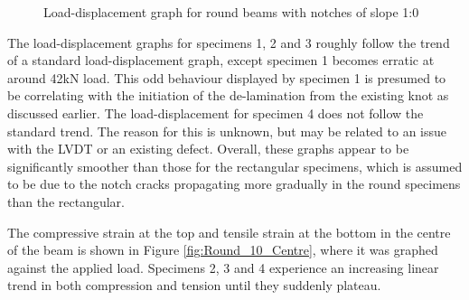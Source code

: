 \documentclass[11pt,a4paper]{article}
\numberwithin{equation}{subsection}
\begin{document}
\vspace*{\baselineskip}

\begin{figure}[h]
	\begin{center}
	\end{center}
	\caption{Load-displacement graph for round beams with notches of slope 1:0}
	\label{fig:Round_10_def}
\end{figure}

\noindent
The load-displacement graphs for specimens 1, 2 and 3 roughly follow the trend of a standard load-displacement graph, except specimen 1 becomes erratic at around 42kN load. This odd behaviour displayed by specimen 1 is presumed to be correlating with the initiation of the de-lamination from the existing knot as discussed earlier. The load-displacement for specimen 4 does not follow the standard trend. The reason for this is unknown, but may be related to an issue with the LVDT or an existing defect. Overall, these graphs appear to be significantly smoother than those for the rectangular specimens, which is assumed to be due to the notch cracks propagating more gradually in the round specimens than the rectangular.

\vspace*{\baselineskip}

\noindent
The compressive strain at the top and tensile strain at the bottom in the centre of the beam is shown in Figure \ref{fig:Round_10_Centre}, where it was graphed against the applied load. Specimens 2, 3 and 4 experience an increasing linear trend in both compression and tension until they suddenly plateau. 

\vspace*{\baselineskip}
\end{document}
